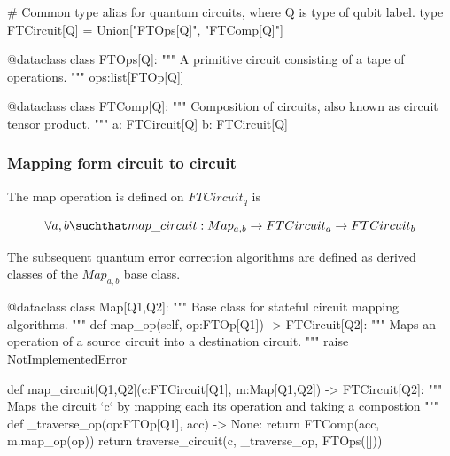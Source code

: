   \begin{python}
  # Common type alias for quantum circuits, where Q is type of qubit label.
  type FTCircuit[Q] = Union["FTOps[Q]", "FTComp[Q]"]

  @dataclass
  class FTOps[Q]:
    """ A primitive circuit consisting of a tape of operations. """
    ops:list[FTOp[Q]]

  @dataclass
  class FTComp[Q]:
    """ Composition of circuits, also known as circuit tensor product. """
    a: FTCircuit[Q]
    b: FTCircuit[Q]
  \end{python}


\subsubsection{Mapping form circuit to circuit}

The map operation is defined on $FTCircuit_q$ is

$$
\forall a,b \suchthat map\_circuit : Map_{a,b} \to FTCircuit_a \to FTCircuit_b
$$

The subsequent quantum error correction algorithms are defined as derived classes of the
$Map_{a,b}$ base class.

  \begin{comment}
    \begin{sh}
    printf '\\begin{%
    cat $PROJECT_ROOT/python/qecsurface/type.py | sedlines.sh 'Circuit mapping'
    printf '\\end{%
    \end{sh}
  \end{comment}

  \begin{python}
  @dataclass
  class Map[Q1,Q2]:
    """ Base class for stateful circuit mapping algorithms. """
    def map_op(self, op:FTOp[Q1]) -> FTCircuit[Q2]:
      """ Maps an operation of a source circuit into a destination circuit. """
      raise NotImplementedError


  def map_circuit[Q1,Q2](c:FTCircuit[Q1], m:Map[Q1,Q2]) -> FTCircuit[Q2]:
    """ Maps the circuit `c` by mapping each its operation and taking a compostion """
    def _traverse_op(op:FTOp[Q1], acc) -> None:
      return FTComp(acc, m.map_op(op))
    return traverse_circuit(c, _traverse_op, FTOps([]))
  \end{python}

